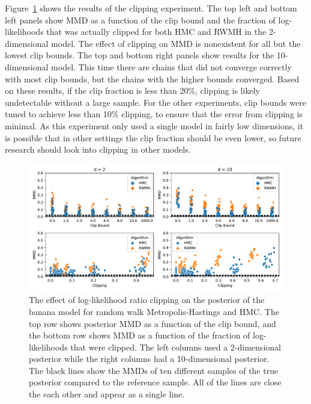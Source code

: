 \documentclass[english,twoside,openright]{HYgraduMLDS}
\begin{document}
Figure~\ref{clip_effect_fig} shows the results of the clipping experiment.
The top left and bottom left panels show MMD as a function of the clip bound 
and the fraction of log-likelihoods that was actually clipped for both
HMC and RWMH in the 2-dimensional model. The effect of clipping on MMD 
is nonexistent for all but the lowest clip bounds. The top and bottom right 
panels show results for the 10-dimensional model. This time there are chains 
that did not converge correctly with most clip bounds, but the chains with 
the higher bounds converged. Based on these results, if the clip fraction is 
less than 20\%, clipping is likely undetectable without a large sample.
For the other experiments, clip bounds were tuned to achieve less than
10\% clipping, to ensure that the error from clipping is minimal.
As this experiment only used a single model in fairly low
dimensions, it is possible that in other settings the clip fraction should be
even lower, so future research should look into clipping in other models.

\begin{figure}[h]
    \centering
    \includegraphics[width=\textwidth]{figures/clipping.pdf}
    \caption{
        The effect of log-likelihood ratio clipping on the posterior of the
        banana model for random walk Metropolis-Hastings and HMC.
        The top row shows posterior MMD as a function of the clip bound, and 
        the bottom row shows MMD as a function of the fraction of log-likelihoods
        that were clipped. The left columns used a 2-dimensional posterior 
        while the right columns had a 10-dimensional posterior. 
        The black lines show the MMDs of ten different samples of the true posterior
        compared to the reference sample. All of the lines are close the each 
        other and appear as a single line.
    }
    \label{clip_effect_fig}
\end{figure}
\end{document}
